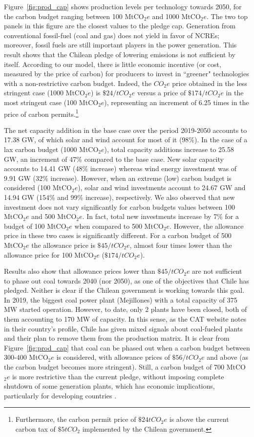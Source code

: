 \documentclass[11pt, letterpaper]{article}
\begin{document}
Figure~\ref{fig:prod_cap} shows production levels per technology towards 2050, for the carbon budget ranging between 100 MtCO$_2e$ and 1000 MtCO$_2e$. The two top panels in  this figure are the closest values to the pledge cap. Generation from conventional fossil-fuel (coal and gas) does not yield in favor of NCREs; moreover, fossil fuels are still important players in the power generation. This result shows that the Chilean pledge of lowering emissions is not sufficient by itself. According to our model, there is little economic incentive (or cost, measured by the price of carbon) for producers to invest in ``greener" technologies with a non-restrictive carbon budget. Indeed, the $CO_2e$ price obtained in the less stringent case (1000 MtCO$_2e$) is $\$24/tCO_2e$ versus a price of $\$174/tCO_2e$ in the most stringent case (100 MtCO$_2e$), representing an increment of 6.25 times in the price of carbon permits.\footnote{Furthermore, the carbon permit price of $\$24 tCO_2e$ is above the current carbon tax of $\$5 tCO_2$ implemented by the Chilean government.} 
\smallskip

The net capacity addition in the base case over the period 2019-2050 accounts to 17.38 GW, of which solar and wind account for most of it (98\%). In the case of a lax carbon budget (1000 MtCO$_2e$), total capacity additions increase to 25.58 GW, an increment of 47\% compared to the base case. New solar capacity accounts to 14.41 GW (48\% increase) whereas wind energy investment was of 9.91 GW (32\% increase). However, when an extreme (low) carbon budget is considered (100 MtCO$_2e$), solar and wind investments account to 24.67 GW and 14.94 GW (154\% and 99\% increase), respectively. We also observed that new investment does not vary significantly for carbon budgets values between 100 MtCO$_2e$ and 500 MtCO$_2e$. In fact, total new investments increase by 7\% for a budget of 100 MtCO$_2e$ when compared to 500 MtCO$_2e$. However, the allowance price in these two cases is significantly different. For a carbon budget of 500 MtCO$_2e$ the allowance price is $\$45/tCO_2e$, almost four times lower than the allowance price for 100 MtCO$_2e$ ($\$174/tCO_2e$).
\smallskip

Results also show that allowance prices lower than $\$45/tCO_2e$ are not sufficient to phase out coal towards 2040 (nor 2050), as one of the objectives that Chile has pledged. Neither is clear if the Chilean government is working towards this goal. In 2019, the biggest coal power plant (Mejillones) with a total capacity of 375 MW started operation. However, to date, only 2 plants have been closed, both of them accounting to 170 MW of capacity. In this sense, as the CAT website notes in their country's profile, Chile has given mixed signals about coal-fueled plants and their plan to remove them from the production matrix. It is clear from Figure~\ref{fig:prod_cap} that coal can be phased out when a carbon budget between 300-400 MtCO$_2e$  is considered, with allowance prices of $\$56/tCO_2e$ and above (as the carbon budget becomes more stringent). Still, a carbon budget of 700 MtCO$_2e$ is more restrictive than the current pledge, without imposing complete shutdown of some generation plants, which has economic implications, particularly for developing countries \cite{Binsted2019}.
\end{document}
